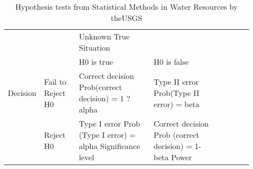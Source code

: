 \begin{table}[htbp]
\caption{Hypothesis tests from Statistical Methods in Water Resources by theUSGS}
\begin{tabular}{llllllll}

 &  & Unknown True Situation &  &  &  &  &  \\ 
 &  & H0 is true & H0 is false &  &  &  &  \\ 
Decision & Fail to Reject H0 & Correct decision Prob(correct decision) = 1 ? alpha & Type II error Prob(Type II error) = beta &  &  &  &  \\ 
 & Reject H0 & Type I error Prob (Type I error) = alpha Significance level & Correct decision Prob (correct decision) = 1-beta Power &  &  &  &  \\ 
\end{tabular}
\label{HypothesisTests}
\end{table}
